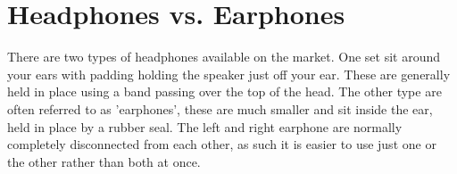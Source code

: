 \section{Headphones vs. Earphones}
There are two types of headphones available on the market.
One set sit around your ears with padding holding the speaker just off your ear. These are generally held in place using a band passing over the top of the head.
The other type are often referred to as 'earphones', these are much smaller and sit inside the ear, held in place by a rubber seal. The left and right earphone are normally completely disconnected from each other, as such it is easier to use just one or the other rather than both at once.
